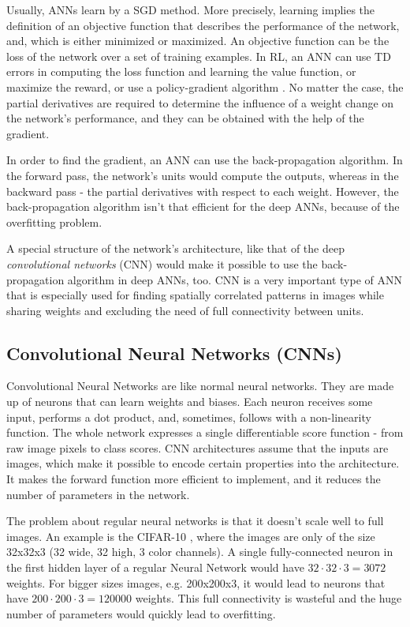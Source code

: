 Usually, ANNs learn by a SGD method. More precisely, learning implies the definition of an objective function that describes the performance of the network, and, which is either minimized or maximized. An objective function can be the loss of the network over a set of training examples. In RL, an ANN can use TD errors in computing the loss function and learning the value function, or maximize the reward, or use a policy-gradient algorithm \cite{Sutton}. No matter the case, the partial derivatives are required to determine the influence of a weight change on the network's performance, and they can be obtained with the help of the gradient.

In order to find the gradient, an ANN can use the back-propagation algorithm. In the forward pass, the network's units would compute the outputs, whereas in the backward pass - the partial derivatives with respect to each weight. However, the back-propagation algorithm isn't that efficient for the deep ANNs, because of the overfitting problem.

A special structure of the network's architecture, like that of the deep \textit{convolutional networks} (CNN) would make it possible to use the back-propagation algorithm in deep ANNs, too. CNN is a very important type of ANN that is especially used for finding spatially correlated patterns in images while sharing weights and excluding the need of full connectivity between units.

\subsection{Convolutional Neural Networks (CNNs)} \label{subsectionCNN}

Convolutional Neural Networks are like normal neural networks. They are made up of neurons that can learn weights and biases. Each neuron receives some input, performs a dot product, and, sometimes, follows with a non-linearity function. The whole network expresses a single differentiable score function - from raw image pixels to class scores. CNN architectures assume that the inputs are images, which make it possible to encode certain properties into the architecture. It makes the forward function more efficient to implement, and it reduces the number of parameters in the network. \cite{CNN_course}           

The problem about regular neural networks is that it doesn't scale well to full images. An example is the CIFAR-10 \cite{CIFAR_10}, where the images are only of the size 32x32x3 (32 wide, 32 high, 3 color channels). A single fully-connected neuron in the first hidden layer of a regular Neural Network would have $32\cdot32\cdot3 = 3072$ weights. For bigger sizes images, e.g. 200x200x3, it would lead to neurons that have $200\cdot200\cdot3 = 120000$ weights. This full connectivity is wasteful and the huge number of parameters would quickly lead to overfitting.

